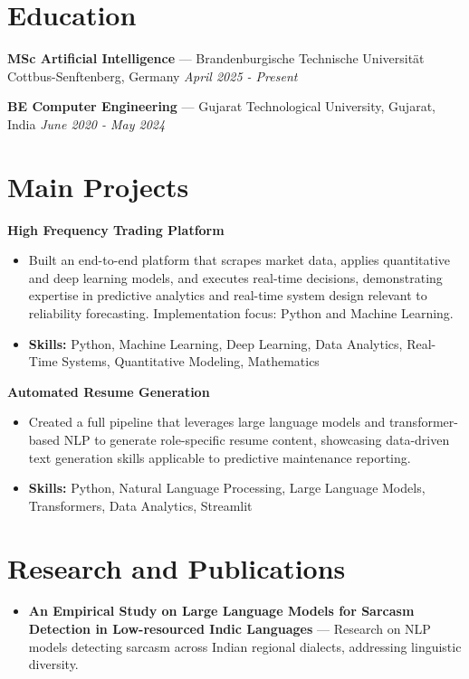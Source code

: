 \documentclass[a4paper,10pt]{article}
\begin{document}
\section*{Education}
\textbf{MSc Artificial Intelligence} — Brandenburgische Technische Universität Cottbus-Senftenberg, Germany \hfill \textit{April 2025 - Present}\par
\vspace{1.5pt}
\textbf{BE Computer Engineering} — Gujarat Technological University, Gujarat, India \hfill \textit{June 2020 - May 2024}\par

\section*{Main Projects}
\textbf{High Frequency Trading Platform}\par
\vspace{1pt}
\begin{itemize}
  \item Built an end-to-end platform that scrapes market data, applies quantitative and deep learning models, and executes real-time decisions, demonstrating expertise in predictive analytics and real-time system design relevant to reliability forecasting. Implementation focus: Python and Machine Learning.
  \item \textbf{Skills:} Python, Machine Learning, Deep Learning, Data Analytics, Real-Time Systems, Quantitative Modeling, Mathematics
\end{itemize}
\vspace{3pt}
\textbf{Automated Resume Generation}\par
\vspace{1pt}
\begin{itemize}
  \item Created a full pipeline that leverages large language models and transformer-based NLP to generate role-specific resume content, showcasing data-driven text generation skills applicable to predictive maintenance reporting.
  \item \textbf{Skills:} Python, Natural Language Processing, Large Language Models, Transformers, Data Analytics, Streamlit
\end{itemize}

\section*{Research and Publications}
\begin{itemize}
\item \textbf{An Empirical Study on Large Language Models for Sarcasm Detection in Low-resourced Indic Languages} — Research on NLP models detecting sarcasm across Indian regional dialects, addressing linguistic diversity.
\end{itemize}
\end{document}
